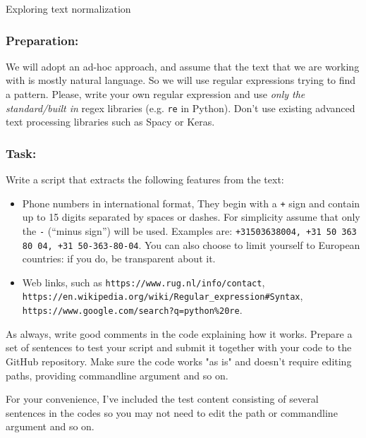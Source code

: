 \documentclass{../labbook}
\begin{document}
\begin{problem}{1}{7}{Exploring text normalization}

\subsubsection*{Preparation:}
We will adopt an ad-hoc approach, and assume that the text that we are working with is mostly natural language. So we will use regular expressions trying to find a pattern. 
Please, write your own regular expression and use \textit{only the standard/built in} regex libraries (e.g. \texttt{re} in Python). Don't use existing advanced text processing libraries such as Spacy or Keras. 

\subsubsection*{Task:}
Write a script that extracts the following features from the text:
\begin{itemize}
    \item Phone numbers in international format, They begin with a \texttt{+} sign and contain up to 15 digits separated by spaces or dashes. For simplicity
assume that only the \texttt{-} (``minus sign'') will be used. Examples are: \texttt{+31503638004, +31 50 363 80 04, +31 50-363-80-04}. You can also choose to limit yourself to European countries: if you do, be transparent about it. 
    \item Web links, such as \texttt{https://www.rug.nl/info/contact}, \\
        \texttt{https://en.wikipedia.org/wiki/Regular\_expression\#Syntax}, \\
        \texttt{https://www.google.com/search?q=python\%20re}.
    \end{itemize}

As always, write good comments in the code explaining how it works.
Prepare a set of sentences to test your script and submit it together with your code to the GitHub repository.
Make sure the code works "as is" and doesn't require editing paths, providing commandline argument and so on.


\end{problem}

\begin{solution}
    For your convenience, I've included the test content consisting of several sentences in the codes so you may not need to edit the path or commandline argument and so on.
\end{solution}
\end{document}
